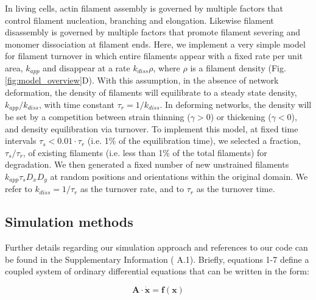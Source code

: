 \documentclass[10pt,letterpaper]{article}
\begin{document}
In living cells, actin filament assembly is governed by multiple factors that control filament nucleation, branching and elongation. Likewise filament disassembly is governed by multiple factors that promote filament severing and monomer dissociation at filament ends. Here, we implement a very simple model for filament turnover in which entire filaments appear with a fixed rate per unit area, $k_{app}$ and disappear at a rate $k_{diss}\rho$, where $\rho$ is a filament density (Fig. \ref{fig:model_overview}D). With this assumption, in the absence of network deformation, the density of filaments will equilibrate to a steady state density, $k_{app}/k_{diss}$, with time constant $\tau_r = 1/k_{diss}$.   In deforming networks, the density will be set by a competition between strain thinning ($\gamma>0$) or thickening ($\gamma<0$), and density equilibration via turnover. To implement this model, at fixed time intervals $\tau_s < 0.01\cdot\tau_r$ (i.e. 1\% of the equilibration time), we selected a fraction, $\tau_s/\tau_r$, of existing filaments (i.e. less than 1\% of the total filaments) for degradation. We then generated a fixed number of new unstrained filaments $k_{app}\tau_sD_xD_y$ at random positions and orientations within the original domain.   We refer to $k_{diss}=1/\tau_r$ as the turnover rate, and to $\tau_r$ as the turnover time.


\subsection*{Simulation methods}

Further details regarding our simulation approach and references to our code can be found in the Supplementary Information ( A.1). Briefly, equations 1-7 define a coupled system of ordinary differential equations that can be written in the form:

\begin{equation}
\mathbf{A \cdot \dot x} = \mathbf{f(x)}
\end{equation}
\end{document}
